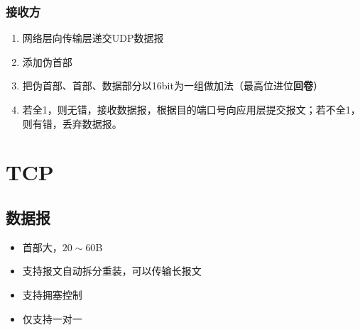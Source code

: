\subsubsection{接收方}
\begin{enumerate}
    \item 网络层向传输层递交UDP数据报
    \item 添加伪首部
    \item 把伪首部、首部、数据部分以16bit为一组做加法（最高位进位\textbf{回卷}）
    \item 若全1，则无错，接收数据报，根据目的端口号向应用层提交报文；若不全1，则有错，丢弃数据报。
\end{enumerate}


\section{TCP}

\subsection{数据报}
\begin{itemize}
    \item 首部大，\(20\sim60\)B
    \item 支持报文自动拆分重装，可以传输长报文
    \item 支持拥塞控制
    \item 仅支持一对一
\end{itemize}


